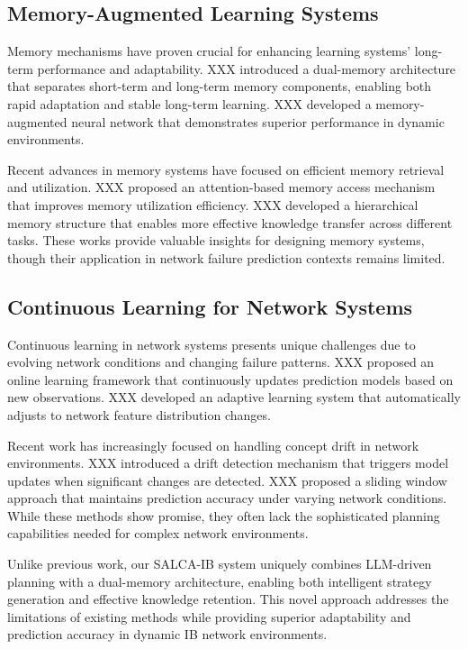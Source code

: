 \documentclass[conference]{IEEEtran}
\begin{document}
\subsection{Memory-Augmented Learning Systems}

Memory mechanisms have proven crucial for enhancing learning systems' long-term performance and adaptability. XXX introduced a dual-memory architecture that separates short-term and long-term memory components, enabling both rapid adaptation and stable long-term learning. XXX developed a memory-augmented neural network that demonstrates superior performance in dynamic environments.

Recent advances in memory systems have focused on efficient memory retrieval and utilization. XXX proposed an attention-based memory access mechanism that improves memory utilization efficiency. XXX developed a hierarchical memory structure that enables more effective knowledge transfer across different tasks. These works provide valuable insights for designing memory systems, though their application in network failure prediction contexts remains limited.

\subsection{Continuous Learning for Network Systems}

Continuous learning in network systems presents unique challenges due to evolving network conditions and changing failure patterns. XXX proposed an online learning framework that continuously updates prediction models based on new observations. XXX developed an adaptive learning system that automatically adjusts to network feature distribution changes.

Recent work has increasingly focused on handling concept drift in network environments. XXX introduced a drift detection mechanism that triggers model updates when significant changes are detected. XXX proposed a sliding window approach that maintains prediction accuracy under varying network conditions. While these methods show promise, they often lack the sophisticated planning capabilities needed for complex network environments.

Unlike previous work, our SALCA-IB system uniquely combines LLM-driven planning with a dual-memory architecture, enabling both intelligent strategy generation and effective knowledge retention. This novel approach addresses the limitations of existing methods while providing superior adaptability and prediction accuracy in dynamic IB network environments.
\end{document}
